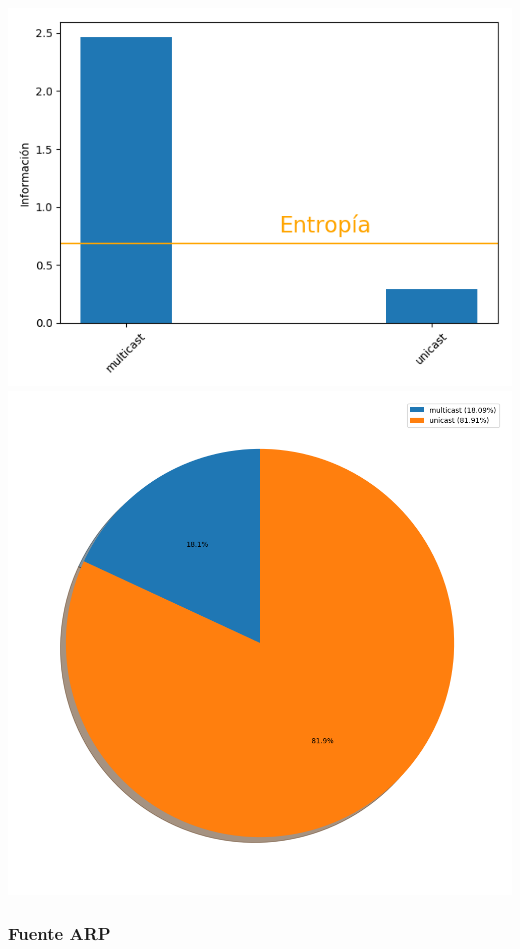  \includegraphics[scale=0.6]{../plots/trabajo_s1_informacion.png}
 \includegraphics[scale=0.4]{../plots/trabajo_s1_probabilidades.png}

\subsubsection{Fuente ARP}

